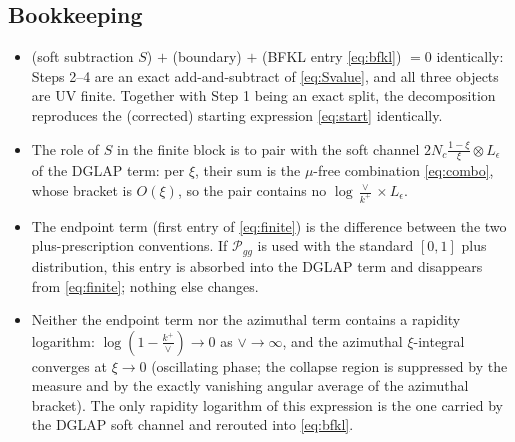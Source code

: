 \documentclass[10pt]{article}
\newcommand{\Leps}{L_{\epsilon}}
\begin{document}
\subsection*{Bookkeeping}
\begin{itemize}
\item[(i)] (soft subtraction $S$) $+$ (boundary) $+$ (BFKL entry \eqref{eq:bfkl}) $=0$
identically: Steps 2--4 are an exact add-and-subtract of \eqref{eq:Svalue}, and all three
objects are UV finite. Together with Step 1 being an exact split, the decomposition reproduces
the (corrected) starting expression \eqref{eq:start} identically.
\item[(ii)] The role of $S$ in the finite block is to pair with the soft channel
$2N_{c}\frac{1-\xi}{\xi}\otimes\Leps$ of the DGLAP term: per $\xi$, their sum is the $\mu$-free
combination \eqref{eq:combo}, whose bracket is $O(\xi)$, so the pair contains no
$\log\frac{\vee}{k^{+}}\times\Leps$.
\item[(iii)] The endpoint term (first entry of \eqref{eq:finite}) is the difference between
the two plus-prescription conventions. If $\mathcal P_{gg}$ is used with the standard $[0,1]$
plus distribution, this entry is absorbed into the DGLAP term and disappears from
\eqref{eq:finite}; nothing else changes.
\item[(iv)] Neither the endpoint term nor the azimuthal term contains a rapidity logarithm:
$\log(1-\frac{k^{+}}{\vee})\to0$ as $\vee\to\infty$, and the azimuthal $\xi$-integral
converges at $\xi\to0$ (oscillating phase; the collapse region is suppressed by the measure
and by the exactly vanishing angular average of the azimuthal bracket). The only rapidity
logarithm of this expression is the one carried by the DGLAP soft channel and rerouted into
\eqref{eq:bfkl}.
\end{itemize}
\end{document}
